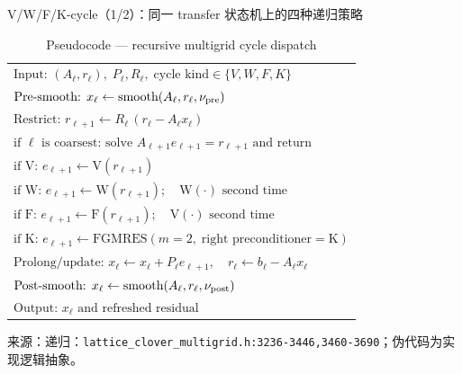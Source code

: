 \documentclass[UTF8,aspectratio=169,11pt]{ctexbeamer}
\newcommand{\source}[1]{%
  \vspace{0.06em}\par{\raggedright\scriptsize\color{muted}来源：#1\par}}
\newcommand{\code}[1]{\nolinkurl{#1}}
\begin{document}
\begin{frame}[t]{V/W/F/K-cycle（1/2）：同一 transfer 状态机上的四种递归策略}
  \begin{table}[htbp]
    \centering
    \caption*{Pseudocode — recursive multigrid cycle dispatch}
    \small
    \renewcommand{\arraystretch}{0.82}
    \begin{tabular}{@{}l@{}}
      $\text{Input: }(A_\ell,r_\ell),\;P_\ell,R_\ell,\;\text{cycle kind}\in\{V,W,F,K\}$ \\
      $\text{Pre-smooth: }x_\ell\gets\text{smooth}(A_\ell,r_\ell,\nu_{\rm pre})$ \\
      $\text{Restrict: }r_{\ell+1}\gets R_\ell\,(r_\ell-A_\ell x_\ell)$ \\
      $\text{if }\ell\text{ is coarsest: solve }A_{\ell+1}e_{\ell+1}=r_{\ell+1}\text{ and return}$ \\
      $\text{if V: }e_{\ell+1}\gets\mathrm{V}(r_{\ell+1})$ \\
      $\text{if W: }e_{\ell+1}\gets\mathrm{W}(r_{\ell+1});\quad\mathrm{W}(\cdot)\text{ second time}$ \\
      $\text{if F: }e_{\ell+1}\gets\mathrm{F}(r_{\ell+1});\quad\mathrm{V}(\cdot)\text{ second time}$ \\
      $\text{if K: }e_{\ell+1}\gets\text{FGMRES}(m=2,\;\text{right preconditioner}=\mathrm{K})$ \\
      $\text{Prolong/update: }x_\ell\gets x_\ell+P_\ell e_{\ell+1},\quad r_\ell\gets b_\ell-A_\ell x_\ell$ \\
      $\text{Post-smooth: }x_\ell\gets\text{smooth}(A_\ell,r_\ell,\nu_{\rm post})$ \\
      $\text{Output: }x_\ell\text{ and refreshed residual}$
    \end{tabular}
  \end{table}
  \source{递归：\code{lattice_clover_multigrid.h:3236-3446,3460-3690}；伪代码为实现逻辑抽象。}
\end{frame}
\end{document}
